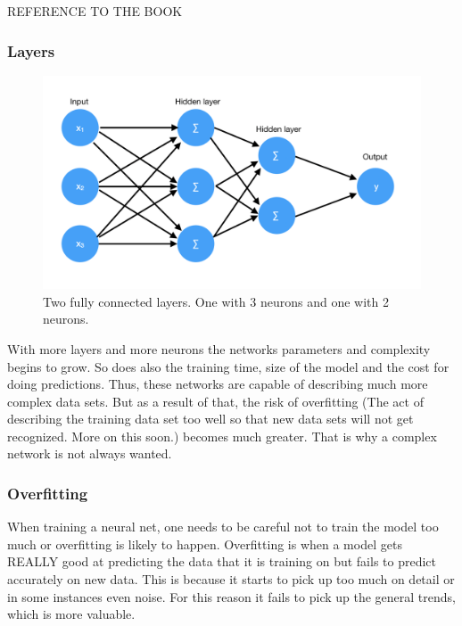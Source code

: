 REFERENCE TO THE BOOK

\subsubsection{Layers}

\begin{figure}[hbtp]
\begin{center}
\includegraphics[width = 1.0\textwidth]{./Images/fully_connected.jpg} 
\caption{Two fully connected layers. One with 3 neurons and one with 2 neurons.}
\end{center}
\end{figure}

With more layers and more neurons the networks parameters and complexity begins to grow. So does also the training time, size of the model and the cost for doing predictions. Thus, these networks are capable of describing much more complex data sets. But as a result of that, the risk of overfitting (The act of describing the training data set too well so that new data sets will not get recognized. More on this soon.) becomes much greater. That is why a complex network is not always wanted.

\subsubsection{Overfitting}
When training a neural net, one needs to be careful not to train the model too much or overfitting is likely to happen. Overfitting is when a model gets REALLY good at predicting the data that it is training on but fails to predict accurately on new data. This is because it starts to pick up too much on detail or in some instances even noise. For this reason it fails to pick up the general trends, which is more valuable. 


